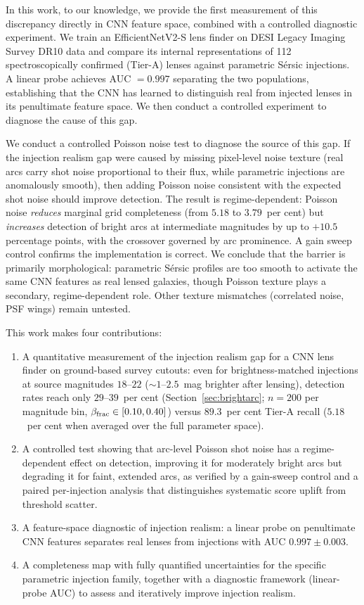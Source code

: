 \documentclass[fleqn,usenatbib]{mnras}
\begin{document}
In this work, to our knowledge, we provide the first measurement of this discrepancy directly in CNN feature space, combined with a controlled diagnostic experiment.  We train an EfficientNetV2-S lens finder on DESI Legacy Imaging Survey DR10 data and compare its internal representations of 112 spectroscopically confirmed (Tier-A) lenses against parametric S\'{e}rsic injections.  A linear probe achieves AUC $= 0.997$ separating the two populations, establishing that the CNN has learned to distinguish real from injected lenses in its penultimate feature space.  We then conduct a controlled experiment to diagnose the cause of this gap.

We conduct a controlled Poisson noise test to diagnose the source of this gap.  If the injection realism gap were caused by missing pixel-level noise texture (real arcs carry shot noise proportional to their flux, while parametric injections are anomalously smooth), then adding Poisson noise consistent with the expected shot noise should improve detection.  The result is regime-dependent: Poisson noise \emph{reduces} marginal grid completeness (from $5.18$ to $3.79$~per cent) but \emph{increases} detection of bright arcs at intermediate magnitudes by up to $+10.5$ percentage points, with the crossover governed by arc prominence.  A gain sweep control confirms the implementation is correct.  We conclude that the barrier is primarily morphological: parametric S\'{e}rsic profiles are too smooth to activate the same CNN features as real lensed galaxies, though Poisson texture plays a secondary, regime-dependent role.  Other texture mismatches (correlated noise, PSF wings) remain untested.

This work makes four contributions:
\begin{enumerate}
\item A quantitative measurement of the injection realism gap for a CNN lens finder on ground-based survey cutouts: even for brightness-matched injections at source magnitudes $18$--$22$ ($\sim\!1$--$2.5$~mag brighter after lensing), detection rates reach only $29$--$39$~per cent (Section~\ref{sec:brightarc}; $n = 200$ per magnitude bin, $\beta_{\rm frac} \in [0.10, 0.40]$) versus $89.3$~per cent Tier-A recall ($5.18$~per cent when averaged over the full parameter space).
\item A controlled test showing that arc-level Poisson shot noise has a regime-dependent effect on detection, improving it for moderately bright arcs but degrading it for faint, extended arcs, as verified by a gain-sweep control and a paired per-injection analysis that distinguishes systematic score uplift from threshold scatter.
\item A feature-space diagnostic of injection realism: a linear probe on penultimate CNN features separates real lenses from injections with AUC $0.997 \pm 0.003$.
\item A completeness map with fully quantified uncertainties for the specific parametric injection family, together with a diagnostic framework (linear-probe AUC) to assess and iteratively improve injection realism.
\end{enumerate}
\end{document}
